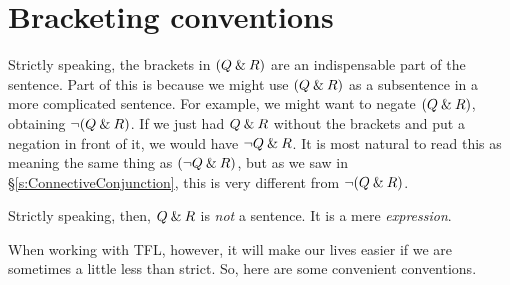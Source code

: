 %
%
%
% 
%

%
%
%
%





\section{Bracketing conventions}
\label{TFLconventions}
Strictly speaking, the brackets in $(Q \mathbin{\&} R)$ are an indispensable part of the sentence. Part of this is because we might use $(Q \mathbin{\&} R)$ as a subsentence in a more complicated sentence. For example, we might want to negate $(Q \mathbin{\&} R)$, obtaining $\neg(Q \mathbin{\&} R)$. If we just had $Q \mathbin{\&} R$ without the brackets and put a negation in front of it, we would have $\neg Q \mathbin{\&} R$. It is most natural to read this as meaning the same thing as $(\neg Q \mathbin{\&} R)$, but as we saw in  \S\ref{s:ConnectiveConjunction}, this is very different from $\neg(Q\mathbin{\&} R)$.

Strictly speaking, then, $Q \mathbin{\&} R$ is \emph{not} a sentence. It is a mere \emph{expression}.

When working with TFL, however, it will make our lives easier if we are sometimes a little less than strict. So, here are some convenient conventions.

